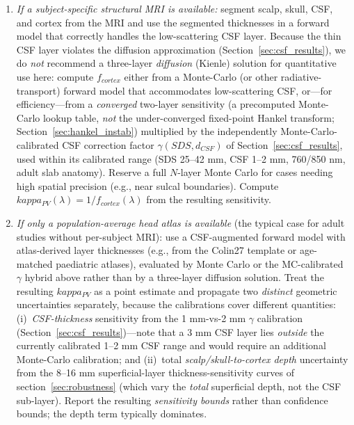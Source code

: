 \documentclass[11pt]{article}
\def\kappa{kappa}%
\def\mathrm#1{#1}%
\def\,{ }%
\begin{document}
\begin{enumerate}
\item \textit{If a subject-specific structural MRI is available:} segment scalp, skull, CSF, and cortex from the MRI and use the segmented thicknesses in a forward model that correctly handles the low-scattering CSF layer. Because the thin CSF layer violates the diffusion approximation (Section~\ref{sec:csf_results}), we do \emph{not} recommend a three-layer \emph{diffusion} (Kienle) solution for quantitative use here: compute $f_{\mathrm{cortex}}$ either from a Monte-Carlo (or other radiative-transport) forward model that accommodates low-scattering CSF, or---for efficiency---from a \emph{converged} two-layer sensitivity (a precomputed Monte-Carlo lookup table, \emph{not} the under-converged fixed-point Hankel transform; Section~\ref{sec:hankel_instab}) multiplied by the independently Monte-Carlo-calibrated CSF correction factor $\gamma(\mathrm{SDS}, d_{\mathrm{CSF}})$ of Section~\ref{sec:csf_results}, used within its calibrated range (SDS 25--42\,mm, CSF 1--2\,mm, 760/850\,nm, adult slab anatomy). Reserve a full $N$-layer Monte Carlo for cases needing high spatial precision (e.g., near sulcal boundaries). Compute $\kappa_{\mathrm{PV}}(\lambda) = 1/f_{\mathrm{cortex}}(\lambda)$ from the resulting sensitivity.
\item \textit{If only a population-average head atlas is available} (the typical case for adult studies without per-subject MRI): use a CSF-augmented forward model with atlas-derived layer thicknesses (e.g., from the Colin27 template\cite{r10} or age-matched paediatric atlases), evaluated by Monte Carlo or the MC-calibrated $\gamma$ hybrid above rather than by a three-layer diffusion solution. Treat the resulting $\kappa_{\mathrm{PV}}$ as a point estimate and propagate two \emph{distinct} geometric uncertainties separately, because the calibrations cover different quantities: (i)~\emph{CSF-thickness} sensitivity from the 1\,mm-vs-2\,mm $\gamma$ calibration (Section~\ref{sec:csf_results})---note that a 3\,mm CSF layer lies \emph{outside} the currently calibrated 1--2\,mm CSF range and would require an additional Monte-Carlo calibration; and (ii)~total \emph{scalp/skull-to-cortex depth} uncertainty from the 8--16\,mm superficial-layer thickness-sensitivity curves of section~\ref{sec:robustness} (which vary the \emph{total} superficial depth, not the CSF sub-layer). Report the resulting \emph{sensitivity bounds} rather than confidence bounds; the depth term typically dominates.

\end{enumerate}
\end{document}
